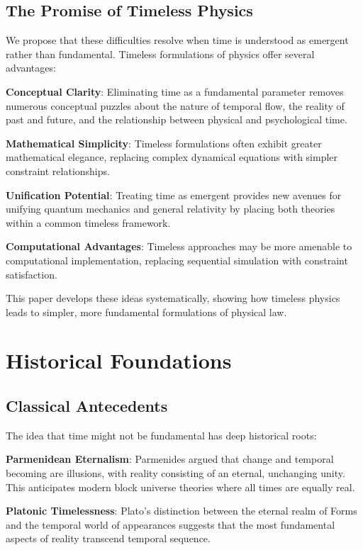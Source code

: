 \documentclass[12pt]{article}
\begin{document}
\subsection{The Promise of Timeless Physics}

We propose that these difficulties resolve when time is understood as emergent rather than fundamental. Timeless formulations of physics offer several advantages:

\textbf{Conceptual Clarity}: Eliminating time as a fundamental parameter removes numerous conceptual puzzles about the nature of temporal flow, the reality of past and future, and the relationship between physical and psychological time.

\textbf{Mathematical Simplicity}: Timeless formulations often exhibit greater mathematical elegance, replacing complex dynamical equations with simpler constraint relationships.

\textbf{Unification Potential}: Treating time as emergent provides new avenues for unifying quantum mechanics and general relativity by placing both theories within a common timeless framework.

\textbf{Computational Advantages}: Timeless approaches may be more amenable to computational implementation, replacing sequential simulation with constraint satisfaction.

This paper develops these ideas systematically, showing how timeless physics leads to simpler, more fundamental formulations of physical law.

\section{Historical Foundations}

\subsection{Classical Antecedents}

The idea that time might not be fundamental has deep historical roots:

\textbf{Parmenidean Eternalism}: Parmenides argued that change and temporal becoming are illusions, with reality consisting of an eternal, unchanging unity. This anticipates modern block universe theories where all times are equally real.

\textbf{Platonic Timelessness}: Plato's distinction between the eternal realm of Forms and the temporal world of appearances suggests that the most fundamental aspects of reality transcend temporal sequence.
\end{document}
